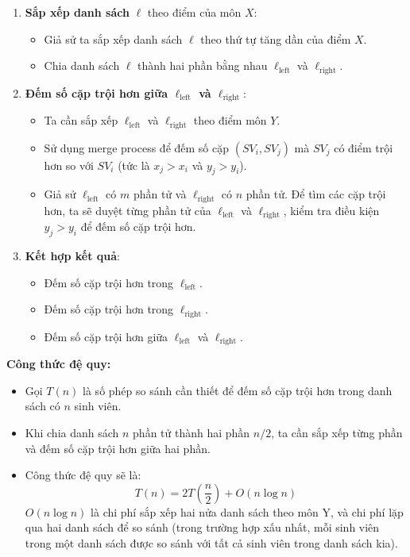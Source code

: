 \documentclass[12pt,a4paper]{article}
\begin{document}
\begin{enumerate}
    \item \textbf{Sắp xếp danh sách} \( \ell \) theo điểm của môn \( X \):
    \begin{itemize}
        \item Giả sử ta sắp xếp danh sách \( \ell \) theo thứ tự tăng dần của điểm \( X \).
        \item Chia danh sách \( \ell \) thành hai phần bằng nhau \( \ell_{\text{left}} \) và \( \ell_{\text{right}} \).
    \end{itemize}
    \item \textbf{Đếm số cặp trội hơn giữa \( \ell_{\text{left}} \) và \( \ell_{\text{right}} \)}:
    \begin{itemize}
        \item Ta cần sắp xếp \( \ell_{\text{left}} \) và \( \ell_{\text{right}} \) theo điểm môn \( Y \).
        \item Sử dụng merge process để đếm số cặp \((SV_i, SV_j)\) mà \( SV_j \) có điểm trội hơn so với \( SV_i \) (tức là \( x_j > x_i \) và \( y_j > y_i \)).
        \item Giả sử \( \ell_{\text{left}} \) có \( m \) phần tử và \( \ell_{\text{right}} \) có \( n \) phần tử. Để tìm các cặp trội hơn, ta sẽ duyệt từng phần tử của \( \ell_{\text{left}} \) và \( \ell_{\text{right}} \), kiểm tra điều kiện \( y_j > y_i \) để đếm số cặp trội hơn.
    \end{itemize}
    \item \textbf{Kết hợp kết quả}:
    \begin{itemize}
        \item Đếm số cặp trội hơn trong \( \ell_{\text{left}} \).
        \item Đếm số cặp trội hơn trong \( \ell_{\text{right}} \).
        \item Đếm số cặp trội hơn giữa \( \ell_{\text{left}} \) và \( \ell_{\text{right}} \).
    \end{itemize}
\end{enumerate}

\textbf{Công thức đệ quy:}

\begin{itemize}
    \item Gọi \( T(n) \) là số phép so sánh cần thiết để đếm số cặp trội hơn trong danh sách có \( n \) sinh viên.
    \item Khi chia danh sách \( n \) phần tử thành hai phần \( n/2 \), ta cần sắp xếp từng phần và đếm số cặp trội hơn giữa hai phần.
    \item Công thức đệ quy sẽ là:
    \[
    T(n) = 2T\left(\frac{n}{2}\right) + O(n\log n)
    \]
    \( O(n \log n) \) là chi phí sắp xếp hai nửa danh sách theo môn Y, và chi phí lặp qua hai danh sách để so sánh (trong trường hợp xấu nhất, mỗi sinh viên trong một danh sách được so sánh với tất cả sinh viên trong danh sách kia).
\end{itemize}
\end{document}

